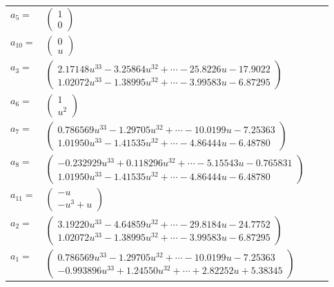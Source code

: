 \documentclass[1p]{elsarticle_modified}
\theoremstyle{definition}
\begin{document}
\begin{tabular}{m{7pt} m{180pt} m{7pt} m{180pt} }
\flushright $a_{5}=$&$\begin{pmatrix}1\\0\end{pmatrix}$ \\
\flushright $a_{10}=$&$\begin{pmatrix}0\\u\end{pmatrix}$ \\
\flushright $a_{3}=$&$\begin{pmatrix}2.17148 u^{33}-3.25864 u^{32}+\cdots-25.8226 u-17.9022\\1.02072 u^{33}-1.38995 u^{32}+\cdots-3.99583 u-6.87295\end{pmatrix}$ \\
\flushright $a_{6}=$&$\begin{pmatrix}1\\u^2\end{pmatrix}$ \\
\flushright $a_{7}=$&$\begin{pmatrix}0.786569 u^{33}-1.29705 u^{32}+\cdots-10.0199 u-7.25363\\1.01950 u^{33}-1.41535 u^{32}+\cdots-4.86444 u-6.48780\end{pmatrix}$ \\
\flushright $a_{8}=$&$\begin{pmatrix}-0.232929 u^{33}+0.118296 u^{32}+\cdots-5.15543 u-0.765831\\1.01950 u^{33}-1.41535 u^{32}+\cdots-4.86444 u-6.48780\end{pmatrix}$ \\
\flushright $a_{11}=$&$\begin{pmatrix}- u\\- u^3+u\end{pmatrix}$ \\
\flushright $a_{2}=$&$\begin{pmatrix}3.19220 u^{33}-4.64859 u^{32}+\cdots-29.8184 u-24.7752\\1.02072 u^{33}-1.38995 u^{32}+\cdots-3.99583 u-6.87295\end{pmatrix}$ \\
\flushright $a_{1}=$&$\begin{pmatrix}0.786569 u^{33}-1.29705 u^{32}+\cdots-10.0199 u-7.25363\\-0.993896 u^{33}+1.24550 u^{32}+\cdots+2.82252 u+5.38345\end{pmatrix}$ \\

\end{tabular}
\end{document}
